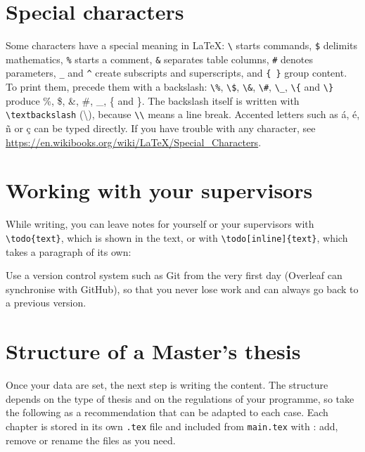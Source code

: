 \section{Special characters}\label{sec:special-characters}

Some characters have a special meaning in \LaTeX: \verb|\| starts commands, \verb|$|
delimits mathematics, \verb|%| starts a comment, \verb|&| separates table columns, \verb|#|
denotes parameters, \verb|_| and \verb|^| create subscripts and superscripts, and
\verb|{ }| group content. To print them, precede them with a backslash: \verb|\%|,
\verb|\$|, \verb|\&|, \verb|\#|, \verb|\_|, \verb|\{| and \verb|\}| produce \%, \$, \&, \#,
\_, \{ and \}. The backslash itself is written with \verb|\textbackslash| (\textbackslash),
because \verb|\\| means a line break. Accented letters such as á, é, ñ or ç can be typed
directly. If you have trouble with any character, see
\url{https://en.wikibooks.org/wiki/LaTeX/Special_Characters}.

\section{Working with your supervisors}\label{sec:review}

While writing, you can leave notes for yourself or your supervisors with
\verb|\todo{text}|, which is shown in the text, or with
\verb|\todo[inline]{text}|, which takes a paragraph of its own:


Use a version control system such as Git from the very first day (Overleaf can synchronise
with GitHub), so that you never lose work and can always go back to a previous version.

\section{Structure of a Master's thesis}\label{sec:tfm-structure}

Once your data are set, the next step is writing the content. The structure depends on the
type of thesis and on the regulations of your programme, so take the following as a
recommendation that can be adapted to each case. Each chapter is stored in its own
\texttt{.tex} file and included from \texttt{main.tex} with \verb||: add, remove or
rename the files as you need.

